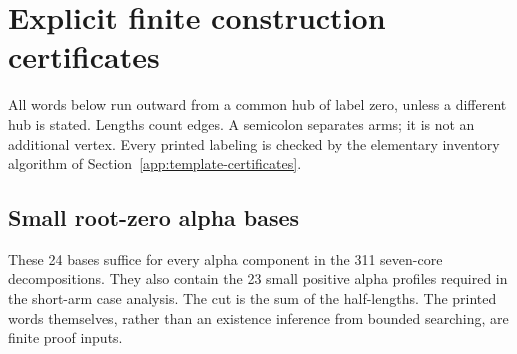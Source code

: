 \section{Explicit finite construction certificates}\label{app:finite-bases}
All words below run outward from a common hub of label zero, unless a different hub is stated. Lengths count edges. A semicolon separates arms; it is not an additional vertex. Every printed labeling is checked by the elementary inventory algorithm of Section~\ref{app:template-certificates}.
\subsection{Small root-zero alpha bases}\label{app:small-finite-alpha}
These 24 bases suffice for every alpha component in the 311 seven-core decompositions. They also contain the 23 small positive alpha profiles required in the short-arm case analysis. The cut is the sum of the half-lengths. The printed words themselves, rather than an existence inference from bounded searching, are finite proof inputs.
\small
